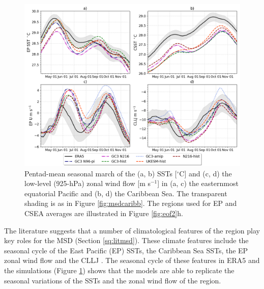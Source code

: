  \begin{figure}[t!]
\includegraphics[width=\linewidth]{figures/index_seasonal}
\caption[Seasonal cycle of East Pacific and Caribbean SSTs and zonal winds.]{Pentad-mean seasonal march of the (a, b) SSTs [$^\circ$C] and (c, d) the low-level (925-hPa) zonal wind flow [m s$^{-1}$] in (a, c) the easternmost equatorial Pacific and (b, d) the Caribbean Sea. The transparent shading is as in Figure \ref{fig:msdcaribb}. The regions used for EP and CSEA averages are illustrated in Figure \ref{fig:eof2}h.}
\label{fig:csst}
\end{figure}
 

The literature suggests that a number of climatological features of the region play key roles for the MSD (Section \ref{sq:litmsd}). These climate features include the seasonal cycle of the East Pacific (EP) SSTs, the Caribbean Sea SSTs, the EP zonal wind flow and the CLLJ \citep{magana1999,amador2008,herrera2015,straffon2019,garcia2020sub}. 
The seasonal cycle of these features in ERA5 and the simulations (Figure \ref{fig:csst}) shows that the models are able to replicate the seasonal variations of the SSTs and the zonal wind flow of the region. %

